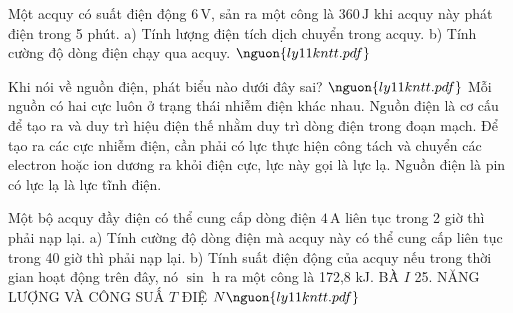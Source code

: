 \begin{ex}
Một acquy có suất điện động $6\,\mathrm{V}$, sản ra một công là $360\,\mathrm{J}$ khi acquy này phát điện trong 5 phút. a) Tính lượng điện tích dịch chuyển trong acquy. b) Tính cường độ dòng điện chạy qua acquy. $\nguon{ly11 kntt.pdf}$
\choiceTF

\end{ex}

\begin{ex}
Khi nói về nguồn điện, phát biểu nào dưới đây sai? $\nguon{ly11 kntt.pdf}$
\choice
{Mỗi nguồn có hai cực luôn ở trạng thái nhiễm điện khác nhau.}
{Nguồn điện là cơ cấu để tạo ra và duy trì hiệu điện thế nhằm duy trì dòng điện trong đoạn mạch.}
{Để tạo ra các cực nhiễm điện, cần phải có lực thực hiện công tách và chuyển các electron hoặc ion dương ra khỏi điện cực, lực này gọi là lực lạ.}
{\True Nguồn điện là pin có lực lạ là lực tĩnh điện.}
\end{ex}

\begin{ex}
Một bộ acquy đầy điện có thể cung cấp dòng điện $4\,\mathrm{A}$ liên tục trong 2 giờ thì phải nạp lại. a) Tính cường độ dòng điện mà acquy này có thể cung cấp liên tục trong 40 giờ thì phải nạp lại. b) Tính suất điện động của acquy nếu trong thời gian hoạt động trên đây, nó $\sin$ h ra một công là 172,8 kJ. BÀ̀ $I$ 25. NĂNG LƯỢNG VÀ CÔNG SUẤ $T$ ĐIỆ $N\nguon{ly11 kntt.pdf}$
\choiceTF

\end{ex}

